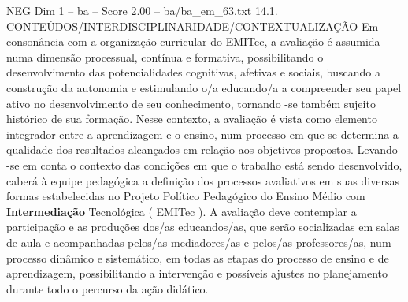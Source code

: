\begin{textsample}{NEG Dim 1 – ba – Score 2.00 – ba/ba\_em\_63.txt}  \label{ex:f1_neg_182}
14.1.
CONTEÚDOS/INTERDISCIPLINARIDADE/CONTEXTUALIZAÇÃO Em consonância com a organização curricular do EMITec, a avaliação é assumida numa dimensão processual, contínua e formativa, possibilitando o desenvolvimento das potencialidades cognitivas, afetivas e sociais, buscando a construção da autonomia e estimulando o/a educando/a a compreender seu papel ativo no desenvolvimento de seu conhecimento, tornando -se também sujeito histórico de sua formação.
Nesse contexto, a avaliação é vista como elemento integrador entre a aprendizagem e o ensino, num processo em que se determina a qualidade dos resultados alcançados em relação aos objetivos propostos.
Levando -se em conta o contexto das condições em que o trabalho está sendo desenvolvido, caberá à equipe pedagógica a definição dos processos avaliativos em suas diversas formas estabelecidas no Projeto Político Pedagógico do Ensino Médio com \textbf{Intermediação} Tecnológica ( EMITec ).
A avaliação deve contemplar a participação e as produções dos/as educandos/as, que serão socializadas em salas de aula e acompanhadas pelos/as mediadores/as e pelos/as professores/as, num processo dinâmico e sistemático, em todas as etapas do processo de ensino e de aprendizagem, possibilitando a intervenção e possíveis ajustes no planejamento durante todo o percurso da ação didático.

\end{textsample}
